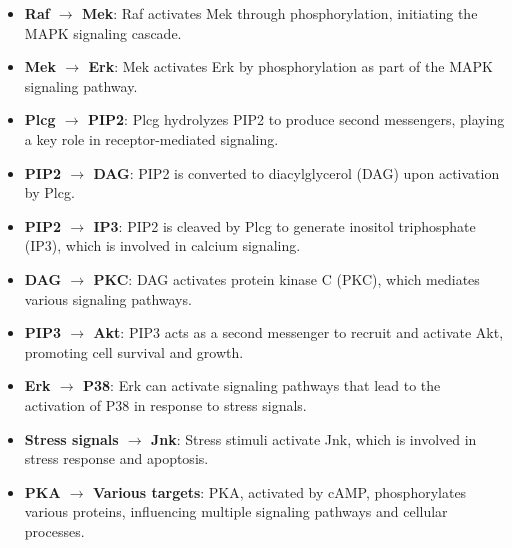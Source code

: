 \documentclass{article}
\begin{document}
\begin{minipage}[t]{0.7\linewidth}
\begin{itemize}
\item \textbf{Raf $\rightarrow$ Mek}: Raf activates Mek through phosphorylation, initiating the MAPK signaling cascade.

\item \textbf{Mek $\rightarrow$ Erk}: Mek activates Erk by phosphorylation as part of the MAPK signaling pathway.

\item \textbf{Plcg $\rightarrow$ PIP2}: Plcg hydrolyzes PIP2 to produce second messengers, playing a key role in receptor-mediated signaling.

\item \textbf{PIP2 $\rightarrow$ DAG}: PIP2 is converted to diacylglycerol (DAG) upon activation by Plcg.

\item \textbf{PIP2 $\rightarrow$ IP3}: PIP2 is cleaved by Plcg to generate inositol triphosphate (IP3), which is involved in calcium signaling.

\item \textbf{DAG $\rightarrow$ PKC}: DAG activates protein kinase C (PKC), which mediates various signaling pathways.

\item \textbf{PIP3 $\rightarrow$ Akt}: PIP3 acts as a second messenger to recruit and activate Akt, promoting cell survival and growth.

\item \textbf{Erk $\rightarrow$ P38}: Erk can activate signaling pathways that lead to the activation of P38 in response to stress signals.

\item \textbf{Stress signals $\rightarrow$ Jnk}: Stress stimuli activate Jnk, which is involved in stress response and apoptosis.

\item \textbf{PKA $\rightarrow$ Various targets}: PKA, activated by cAMP, phosphorylates various proteins, influencing multiple signaling pathways and cellular processes.
\end{itemize}
\end{minipage}
\hspace{0.05\textwidth}
\end{document}
